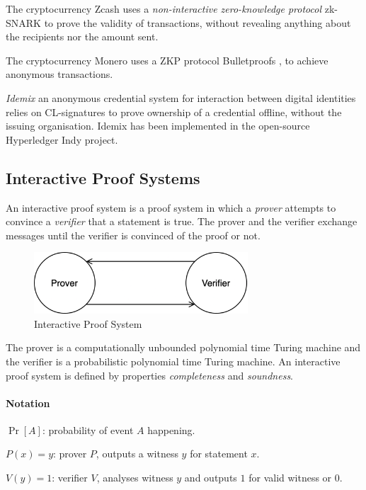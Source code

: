 The cryptocurrency Zcash uses a \textit{non-interactive zero-knowledge protocol} zk-SNARK \cite{bowe2018multi} to prove the validity of transactions, without revealing anything about the recipients nor the amount sent.

The cryptocurrency Monero uses a ZKP protocol Bulletproofs \cite{bunz2018bulletproofs}, to achieve anonymous transactions.

\textit{Idemix} \cite{camenisch2002design} an anonymous credential system for interaction between digital identities relies on CL-signatures \cite{camenisch2001efficient} to prove ownership of a credential offline, without the issuing organisation.
Idemix has been implemented in the open-source Hyperledger Indy project.

\newpage
\subsection{Interactive Proof Systems}
An interactive proof system is a proof system in which a \textit{prover} attempts to convince a \textit{verifier} that a statement is true.
The prover and the verifier exchange messages until the verifier is convinced of the proof or not.

\begin{figure}[h]
	\centering
	\includegraphics[width=8cm]{images/interactive-proof-system}
	\caption{Interactive Proof System}
	\label{fig:interactive-proof-system}
\end{figure}

The prover is a computationally unbounded polynomial time Turing machine and the verifier is a probabilistic polynomial time Turing machine.
An interactive proof system is defined by properties \textit{completeness} and \textit{soundness}.

\paragraph{Notation}
\begin{description}
	\item $\Pr[A]$: probability of event $A$ happening.
	\item $P(x) = y$: prover $P$, outputs a witness $y$ for statement $x$.
	\item $V(y) = 1$: verifier $V$, analyses witness $y$ and outputs $1$ for valid witness or $0$.
\end{description}

